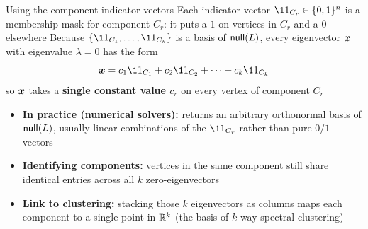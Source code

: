 \documentclass[aspectratio=169]{beamer}\usepackage[]{graphicx}\usepackage[]{xcolor}
\begin{document}
\begin{frame}{Using the component indicator vectors}
Each indicator vector $\11_{C_r} \in \{0, 1\}^n$ is a membership mask for component $C_r$: it puts a $1$ on vertices in $C_r$ and a $0$ elsewhere
\vfill
Because $\{\11_{C_1}, \ldots, \11_{C_k}\}$ is a basis of $\mathsf{null}(L)$, every eigenvector $\bm{x}$ with eigenvalue $\lambda = 0$ has the form
\[
\bx = c_1 \11_{C_1} + c_2 \11_{C_2} + \cdots + c_k \11_{C_k}
\]
so $\bm{x}$ takes a \textbf{single constant value $c_r$} on every vertex of component $C_r$
\vfill
\begin{itemize}
\item \textbf{In practice (numerical solvers):}  returns an arbitrary orthonormal basis of $\mathsf{null}(L)$, usually linear combinations of the $\11_{C_r}$ rather than pure $0$/$1$ vectors
\item \textbf{Identifying components:} vertices in the same component still share identical entries across all $k$ zero-eigenvectors
\item \textbf{Link to clustering:} stacking those $k$ eigenvectors as columns maps each component to a single point in $\mathbb{R}^k$ (the basis of $k$-way spectral clustering)
\end{itemize}
\end{frame}
\end{document}
